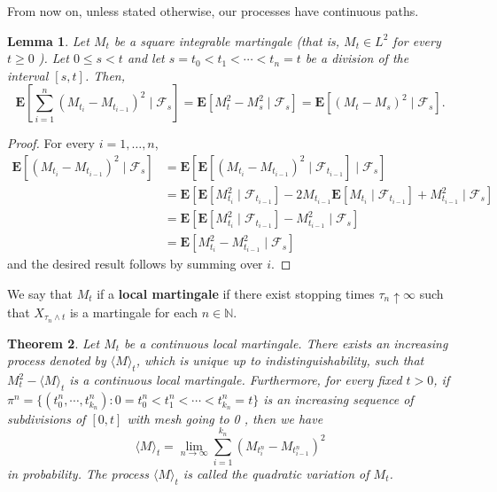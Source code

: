 \documentclass[twoside, 12pt]{book}
\numberwithin{equation}{chapter}
\newtheorem{theorem}{Theorem}[section]
\newtheorem{lemma}[theorem]{Lemma}
\def\mN{{\mathbb N}}
\def\bE{{\mathbf E}}
\def\geq{\geqslant}
\def\leq{\leqslant}
\begin{document}
	From now on, unless stated otherwise, our processes have continuous paths. 
	
	\begin{lemma}
		Let $M_t$ be a square integrable martingale (that is, $M_t \in L^2$ for every $t \geq 0$ ). Let $0 \leq s<t$ and let $s=t_0<t_1<\cdots<t_n=t$ be a division of the interval $[s, t]$. Then,
		$$
		\bE\left[\sum_{i=1}^n\left(M_{t_i}-M_{t_{i-1}}\right)^2 \mid \mathcal{F}_s\right]=\bE\left[M_t^2-M_s^2 \mid \mathcal{F}_s\right]=\bE\left[\left(M_t-M_s\right)^2 \mid \mathcal{F}_s\right] .
		$$
	\end{lemma}
	\begin{proof}
		For every $i=1, \ldots, n$,
		$$
		\begin{aligned}
			\bE \left[ \left(M_{t_i}-M_{t_{i-1}}\right)^2 \mid \mathcal{F}_s\right] & =\bE\left[\bE \left[\left(M_{t_i}-M_{t_{i-1}}\right)^2 \mid \mathcal{F}_{t_{i-1}}\right] \mid \mathcal{F}_s\right] \\
			& =\bE\left[\bE\left[M_{t_i}^2 \mid \mathcal{F}_{t_{i-1}}\right]-2 M_{t_{i-1}} \bE\left[M_{t_i} \mid \mathcal{F}_{t_{i-1}}\right]+M_{t_{i-1}}^2 \mid \mathcal{F}_s\right] \\
			& =\bE\left[\bE\left[M_{t_i}^2 \mid \mathcal{F}_{t_{i-1}}\right]-M_{t_{i-1}}^2 \mid \mathcal{F}_s\right] \\
			& =\bE\left[M_{t_i}^2-M_{t_{i-1}}^2 \mid \mathcal{F}_s\right]
		\end{aligned}
		$$
		and the desired result follows by summing over $i$. 
	\end{proof}
	
	We say that $M_t$ if a {\bf local martingale} if there exist stopping times $\tau_n\uparrow \infty$ such that $X_{\tau_n\wedge t}$ is a martingale for each $n\in \mN$.
	\begin{theorem}\label{Thm:quadratic}
		Let $M_t$ be a continuous local martingale. There exists an increasing process denoted by $\langle M \rangle_t$, which is unique up to indistinguishability, such that $M_t^2-\langle M\rangle_t$ is a continuous local martingale. Furthermore, for every fixed $t>0$, if $\pi^n=\{(t_0^n,\cdots, t_{k_n}^n): 0=t_0^n<t_1^n<\cdots<t_{k_n}^n=t\}$ is an increasing sequence of subdivisions of $[0, t]$ with mesh going to 0 , then we have
		$$
		\langle  M\rangle_t=\lim _{n \rightarrow \infty} \sum_{i=1}^{k_n}\left(M_{t_i^n}-M_{t_{i-1}^n}\right)^2
		$$
		in probability. The process $\langle M\rangle_t$ is called the quadratic variation of $M_t $. 
	\end{theorem}
	
\end{document}
